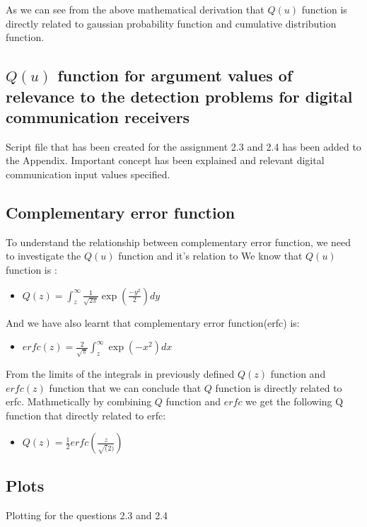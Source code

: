 As we can see from the above mathematical derivation that $Q(u)$ function is directly related to gaussian probability function and cumulative distribution function.
\subsection{ $Q(u)$ function for argument values of relevance to the detection problems for digital communication receivers}
Script file that has been created for the assignment 2.3 and 2.4 has been added to the Appendix. Important concept has been explained and relevant digital communication input values specified.

\subsection{Complementary error function}
To understand the relationship between complementary error function, we need to investigate the $Q(u)$ function and it's relation to 
We know that $Q(u)$ function is :
\begin{itemize}
	\item $Q(z) = \int_{z}^{\infty} \frac{1}{\sqrt{2 \pi}} \exp(\frac{-y^2} {2}) dy$
\end{itemize}

And we have also learnt that complementary error function(erfc) is:
\begin{itemize}
	\item $erfc(z)= \frac{2}{\sqrt{\pi}} \int_{z}^{\infty} \exp(-x^2) dx$
\end{itemize}

From the limits of the integrals in previously defined $Q(z)$ function and $erfc(z)$ function that we can conclude that $Q$ function is directly related to erfc. Mathmetically by combining $Q$ function and $erfc$  we get the following Q function that directly related to erfc:

\begin{itemize}
	\item $Q(z)= \frac{1}{2} erfc(\frac{z}{\sqrt(2)})$
\end{itemize}



\subsection{Plots}
Plotting for the questions 2.3 and 2.4
